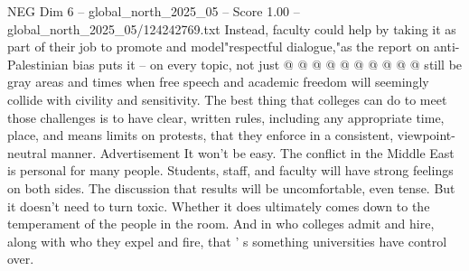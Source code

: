 \begin{textsample}{NEG Dim 6 – global\_north\_2025\_05 – Score 1.00 – global\_north\_2025\_05/124242769.txt}
Instead, faculty could help by taking it as part of their job to promote and model"respectful dialogue,"as the report on anti-Palestinian bias puts it -- on every topic, not just @ @ @ @ @ @ @ @ @ @ still be gray areas and times when free speech and academic freedom will seemingly collide with civility and sensitivity.
The best thing that colleges can do to meet those challenges is to have clear, written rules, including any appropriate time, place, and means limits on protests, that they enforce in a consistent, viewpoint-neutral manner.
Advertisement It won't be easy.
The conflict in the Middle East is personal for many people.
Students, staff, and faculty will have strong feelings on both sides.
The discussion that results will be uncomfortable, even tense.
But it doesn't need to turn toxic.
Whether it does ultimately comes down to the temperament of the people in the room.
And in who colleges admit and hire, along with who they expel and fire, that ' s something universities have control over.

\end{textsample}
